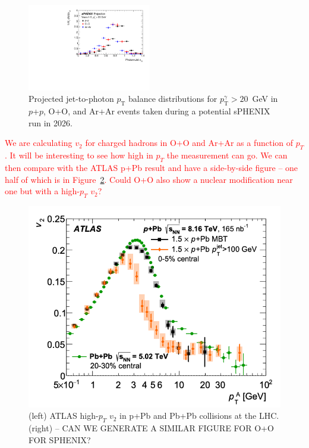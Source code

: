\begin{figure}[h]
\centering
\includegraphics[width=0.48\textwidth]{figs/xJg_3}
\caption{Projected jet-to-photon $p_\mathrm{T}$ balance distributions for $p_\mathrm{T}^{\gamma} > 20$~GeV in $p$+$p$, O+O, and Ar+Ar events taken during a potential sPHENIX run in 2026.}
\label{fig:jet_xJg_SmallSystems}
\end{figure}

{\textcolor{red}{We are calculating $v_{2}$ for charged hadrons in O+O and Ar+Ar as a function of $p_T$.   It will be interesting to see how high in $p_T$ the measurement can go.   We can then compare with the ATLAS p+Pb result and have a side-by-side figure -- one half of which is in Figure~\ref{fig:atlaspbhighpt}.   Could O+O also show a nuclear modification near one but with a high-$p_{T}$ $v_2$?}}

\begin{figure}
    \centering
    \includegraphics[width=0.47\linewidth]{figs/figure_atlas_highptv2_ppb.png}
    \caption{(left) ATLAS high-$p_{T}$ $v_{2}$ in p+Pb and Pb+Pb collisions at the LHC.
    (right) -- CAN WE GENERATE A SIMILAR FIGURE FOR O+O FOR SPHENIX? {\color{red}{DVP: Yes, but after the initial circulation to the Collaboration}}}
    \label{fig:atlaspbhighpt}
\end{figure}

